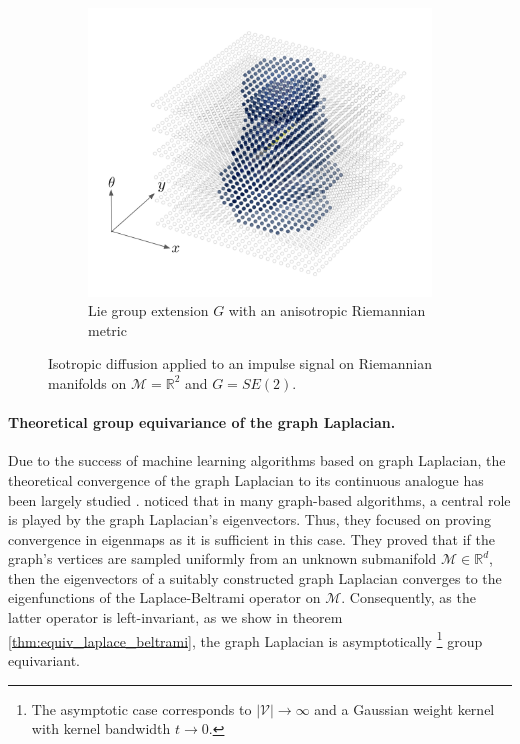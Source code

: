\documentclass{article}
\begin{document}
\begin{figure}[h!]
\begin{subfigure}[b]{0.3\textwidth}
        \includegraphics[width=\textwidth]{Images/se2_anisotropic_diffusion.png}
        \caption{Lie group extension $G$ with an anisotropic Riemannian metric}
    \end{subfigure}
    \caption{Isotropic diffusion applied to an impulse signal on Riemannian manifolds on $\mathcal{M}=\mathbb{R}^2$ and $G=SE(2)$. }%
    \label{fig:graph_diffusion}
\end{figure}


\paragraph{Theoretical group equivariance of the graph Laplacian.} Due to the success of machine learning algorithms based on graph Laplacian, the theoretical convergence of the graph Laplacian to its continuous analogue has been largely studied \citep{hein2005graphs, singer2006graph}. \cite{belkin2006convergence} noticed that in many graph-based algorithms, a central role is played by the graph Laplacian's eigenvectors. Thus, they focused on proving convergence in eigenmaps as it is sufficient in this case. They proved that if the graph's vertices are sampled uniformly from an unknown submanifold $\mathcal{M} \in \mathbb{R}^d$, then the eigenvectors of a suitably constructed graph Laplacian converges to the eigenfunctions of the Laplace-Beltrami operator on $\mathcal{M}$. Consequently, as the latter operator is left-invariant, as we show in theorem \ref{thm:equiv_laplace_beltrami}, the graph Laplacian is asymptotically \footnote{The asymptotic case corresponds to $|\mathcal{V}| \to \infty$ and a Gaussian weight kernel with kernel bandwidth $t \to 0$.} group equivariant.
\end{document}
